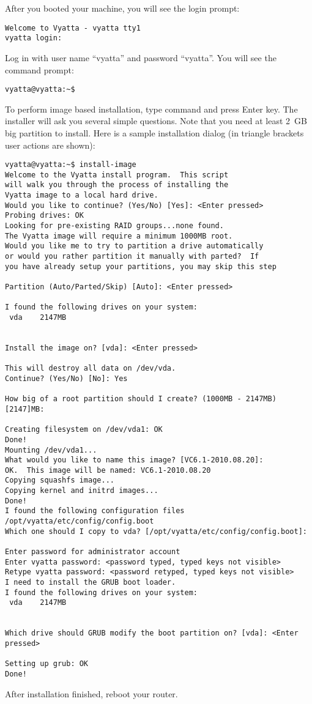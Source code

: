 After you booted your machine, you will see the login prompt:
\begin{verbatim}
Welcome to Vyatta - vyatta tty1
vyatta login: 
\end{verbatim}

Log in with user name ``vyatta'' and password ``vyatta''. You will see the command prompt:
\begin{verbatim}
vyatta@vyatta:~$
\end{verbatim}

To perform image based installation, type command  and press Enter key. The installer will ask
you several simple questions. Note that you need at least 2~GB big partition to install.
Here is a sample installation dialog (in triangle brackets user actions are shown):
\begin{verbatim}
vyatta@vyatta:~$ install-image 
Welcome to the Vyatta install program.  This script
will walk you through the process of installing the
Vyatta image to a local hard drive.
Would you like to continue? (Yes/No) [Yes]: <Enter pressed>
Probing drives: OK
Looking for pre-existing RAID groups...none found.
The Vyatta image will require a minimum 1000MB root.
Would you like me to try to partition a drive automatically
or would you rather partition it manually with parted?  If
you have already setup your partitions, you may skip this step

Partition (Auto/Parted/Skip) [Auto]: <Enter pressed>

I found the following drives on your system:
 vda	2147MB


Install the image on? [vda]: <Enter pressed>

This will destroy all data on /dev/vda.
Continue? (Yes/No) [No]: Yes

How big of a root partition should I create? (1000MB - 2147MB) [2147]MB: 

Creating filesystem on /dev/vda1: OK
Done!
Mounting /dev/vda1...
What would you like to name this image? [VC6.1-2010.08.20]: 
OK.  This image will be named: VC6.1-2010.08.20
Copying squashfs image...
Copying kernel and initrd images...
Done!
I found the following configuration files
/opt/vyatta/etc/config/config.boot
Which one should I copy to vda? [/opt/vyatta/etc/config/config.boot]: 

Enter password for administrator account
Enter vyatta password: <password typed, typed keys not visible>
Retype vyatta password: <password retyped, typed keys not visible>
I need to install the GRUB boot loader.
I found the following drives on your system:
 vda	2147MB


Which drive should GRUB modify the boot partition on? [vda]: <Enter pressed>

Setting up grub: OK
Done!
\end{verbatim}
After installation finished, reboot your router.


